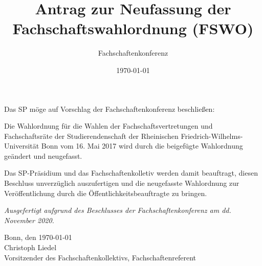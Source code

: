\documentclass[DIV=12, parskip=half, fontsize=12pt, a4paper]{scrartcl}
\title{Antrag zur Neufassung der Fachschaftswahlordnung (FSWO)}
\author{Fachschaftenkonferenz}
\date{\today}
\begin{document}
  \maketitle
  Das SP möge auf Vorschlag der Fachschaftenkonferenz beschließen:

  \begin{linenumbers}
    Die Wahlordnung für die Wahlen der Fachschaftsvertretungen und Fachschaftsräte der Studierendenschaft der Rheinischen Friedrich-Wilhelms-Universität Bonn vom 16. Mai 2017 wird durch die beigefügte Wahlordnung geändert und neugefasst.

    Das  SP-Präsidium und das Fachschaftenkolletiv  werden  damit  beauftragt,  diesen Beschluss unverzüglich auszufertigen und die neugefasste Wahlordnung zur Veröffentlichung durch die Öffentlichkeitsbeauftragte zu bringen.
  \end{linenumbers}

  \vspace{1em}
  \textit{Ausgefertigt aufgrund des Beschlusses der Fachschaftenkonferenz am dd. November 2020.}

  Bonn, den \today \\
  Christoph Liedel \\
  {\scriptsize Vorsitzender des Fachschaftenkollektivs, Fachschaftenreferent}

  \clearpage
  
\end{document}
